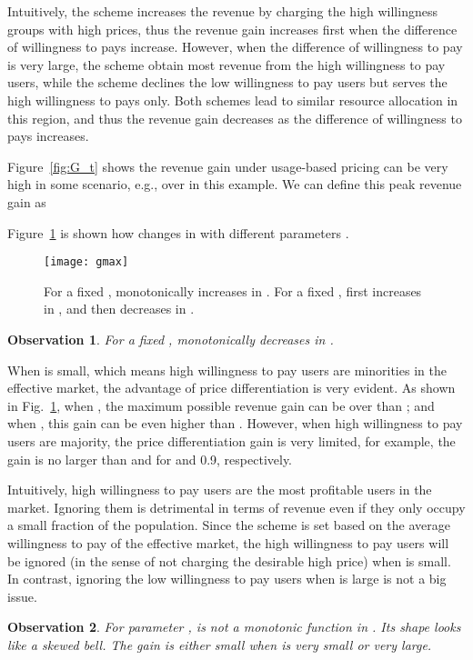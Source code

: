 \documentclass[twocolumn,10pt,twosided]{IEEEtran}
\newtheorem{observation}{Observation}
\begin{document}
Intuitively, the  scheme increases the revenue by charging the high willingness groups with high prices, thus the revenue gain increases first when the difference of willingness to pays increase. However, when the difference of willingness to pay is very large, the  scheme obtain most revenue from the high willingness to pay users, while the  scheme declines the low willingness to pay users but serves the high willingness to pays only. Both schemes lead to similar resource allocation in this region, and thus the revenue gain decreases as the difference of willingness to pays increases.



Figure~\ref{fig:G_t} shows the revenue gain under usage-based
pricing can be very high in some scenario, e.g., over  in this
example. We can define this peak revenue gain as

Figure~\ref{fig:gmax} is shown how  changes in  with
different parameters .
\begin{figure}[htb]
\centering
\texttt{[image: gmax]}
\caption{For a fixed ,  monotonically increases in . For a fixed ,  first increases in , and then decreases in .} \label{fig:gmax}
\end{figure}
\begin{observation}
For a fixed ,  monotonically decreases in  .
\end{observation}

When  is small, which means high willingness to pay users are minorities in the effective market, the advantage of price differentiation is very evident. As shown in Fig.~\ref{fig:gmax}, when , the maximum possible revenue gain can be over than ; and when , this gain can be even higher than . However, when high willingness to pay users are majority, the price differentiation gain is very limited, for example,  the gain is no larger than  and   for  and 0.9, respectively.

Intuitively, high willingness to pay users are the most profitable users in the market. Ignoring them  is detrimental in terms of revenue even if they only occupy a small fraction of the population. Since the  scheme is set based on the average willingness to pay of the effective market, the high willingness to pay users will be ignored  (in the sense of not charging the desirable high price) when  is small. In contrast, ignoring the low willingness to pay users when  is large is not a big issue.


\begin{observation}
For parameter ,  is not a monotonic function in . Its shape looks like a skewed bell. The gain is either small when  is very small or very large.
\end{observation}
\end{document}
